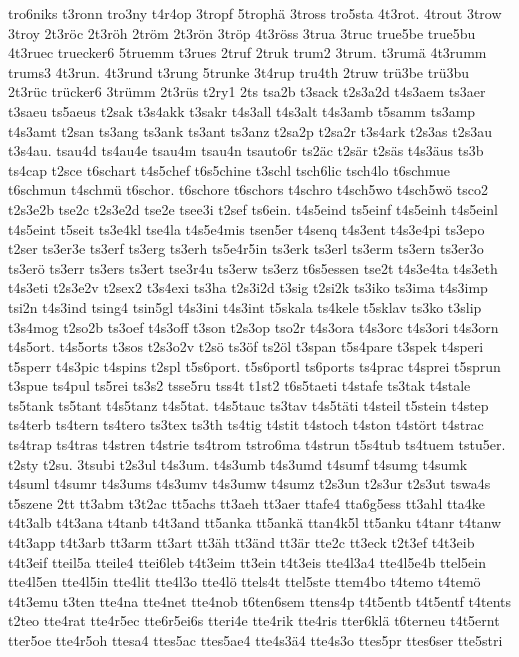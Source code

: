 {tro6niks
t3ronn
tro3ny
t4r4op
3tropf
5trophä
3tross
tro5sta
4t3rot.
4trout
3trow
3troy
2t3röc
2t3röh
2tröm
2t3rön
3tröp
4t3röss
3trua
3truc
true5be
true5bu
4t3ruec
truecker6
5truemm
t3rues
2truf
2truk
trum2
3trum.
t3rumä
4t3rumm
trums3
4t3run.
4t3rund
t3rung
5trunke
3t4rup
tru4th
2truw
trü3be
trü3bu
2t3rüc
trücker6
3trümm
2t3rüs
t2ry1
2ts
tsa2b
t3sack
t2s3a2d
t4s3aem
ts3aer
t3saeu
ts5aeus
t2sak
t3s4akk
t3sakr
t4s3all
t4s3alt
t4s3amb
t5samm
ts3amp
t4s3amt
t2san
ts3ang
ts3ank
ts3ant
ts3anz
t2sa2p
t2sa2r
t3s4ark
t2s3as
t2s3au
t3s4au.
tsau4d
ts4au4e
tsau4m
tsau4n
tsauto6r
ts2äc
t2sär
t2säs
t4s3äus
ts3b
ts4cap
t2sce
t6schart
t4s5chef
t6s5chine
t3schl
tsch6lic
tsch4lo
t6schmue
t6schmun
t4schmü
t6schor.
t6schore
t6schors
t4schro
t4sch5wo
t4sch5wö
tsco2
t2s3e2b
tse2c
t2s3e2d
tse2e
tsee3i
t2sef
ts6ein.
t4s5eind
ts5einf
t4s5einh
t4s5einl
t4s5eint
t5seit
ts3e4kl
tse4la
t4s5e4mis
tsen5er
t4senq
t4s3ent
t4s3e4pi
ts3epo
t2ser
ts3er3e
ts3erf
ts3erg
ts3erh
ts5e4r5in
ts3erk
ts3erl
ts3erm
ts3ern
ts3er3o
ts3erö
ts3err
ts3ers
ts3ert
tse3r4u
ts3erw
ts3erz
t6s5essen
tse2t
t4s3e4ta
t4s3eth
t4s3eti
t2s3e2v
t2sex2
t3s4exi
ts3ha
t2s3i2d
t3sig
t2si2k
ts3iko
ts3ima
t4s3imp
tsi2n
t4s3ind
tsing4
tsin5gl
t4s3ini
t4s3int
t5skala
ts4kele
t5sklav
ts3ko
t3slip
t3s4mog
t2so2b
ts3oef
t4s3off
t3son
t2s3op
tso2r
t4s3ora
t4s3orc
t4s3ori
t4s3orn
t4s5ort.
t4s5orts
t3sos
t2s3o2v
t2sö
ts3öf
ts2öl
t3span
t5s4pare
t3spek
t4speri
t5sperr
t4s3pic
t4spins
t2spl
t5s6port.
t5s6portl
ts6ports
ts4prac
t4sprei
t5sprun
t3spue
ts4pul
ts5rei
ts3s2
tsse5ru
tss4t
t1st2
t6s5taeti
t4stafe
ts3tak
t4stale
ts5tank
ts5tant
t4s5tanz
t4s5tat.
t4s5tauc
ts3tav
t4s5täti
t4steil
t5stein
t4step
ts4terb
ts4tern
ts4tero
ts3tex
ts3th
ts4tig
t4stit
t4stoch
t4ston
t4stört
t4strac
ts4trap
ts4tras
t4stren
t4strie
ts4trom
tstro6ma
t4strun
t5s4tub
ts4tuem
tstu5er.
t2sty
t2su.
3tsubi
t2s3ul
t4s3um.
t4s3umb
t4s3umd
t4sumf
t4sumg
t4sumk
t4suml
t4sumr
t4s3ums
t4s3umv
t4s3umw
t4sumz
t2s3un
t2s3ur
t2s3ut
tswa4s
t5szene
2tt
tt3abm
t3t2ac
tt5achs
tt3aeh
tt3aer
ttafe4
tta6g5ess
tt3ahl
tta4ke
t4t3alb
t4t3ana
t4tanb
t4t3and
tt5anka
tt5ankä
ttan4k5l
tt5anku
t4tanr
t4tanw
t4t3app
t4t3arb
tt3arm
tt3art
tt3äh
tt3änd
tt3är
tte2c
tt3eck
t2t3ef
t4t3eib
t4t3eif
tteil5a
tteile4
ttei6leb
t4t3eim
tt3ein
t4t3eis
tte4l3a4
tte4l5e4b
ttel5ein
tte4l5en
tte4l5in
tte4lit
tte4l3o
tte4lö
ttels4t
ttel5ste
ttem4bo
t4temo
t4temö
t4t3emu
t3ten
tte4na
tte4net
tte4nob
t6ten6sem
ttens4p
t4t5entb
t4t5entf
t4tents
t2teo
tte4rat
tte4r5ec
tte6r5ei6s
tteri4e
tte4rik
tte4ris
tter6klä
t6terneu
t4t5ernt
tter5oe
tte4r5oh
ttesa4
ttes5ac
ttes5ae4
tte4s3ä4
tte4s3o
ttes5pr
ttes6ser
tte5stri
}
